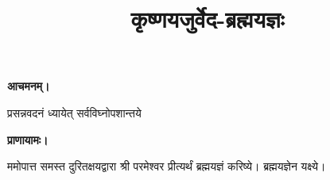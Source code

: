 \setmainfont[Script=Devanagari,Mapping=tex-text,Mapping=devanagarinumerals,AutoFakeBold=2.0]{Siddhanta}
\title{\Huge कृष्णयजुर्वेद-ब्रह्मयज्ञः}
\date{}
\maketitle
\clearemptydoublepage
{}


\textbf{आचमनम्।}

{प्रसन्नवदनं ध्यायेत् सर्वविघ्नोपशान्तये}

\textbf{प्राणायामः।}

ममोपात्त समस्त दुरितक्षयद्वारा श्री परमेश्वर प्रीत्यर्थं ब्रह्मयज्ञं करिष्ये। ब्रह्मयज्ञेन यक्ष्ये।


